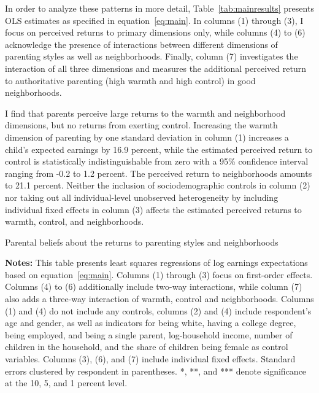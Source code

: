 \documentclass[12pt, a4paper, english]{article}
\begin{document}
In order to analyze these patterns in more detail, Table~\ref{tab:mainresults} presents OLS estimates as specified in equation~\eqref{eq:main}. In columns (1) through (3), I focus on perceived returns to primary dimensions only, while columns (4) to (6) acknowledge the presence of interactions between different dimensions of parenting styles as well as neighborhoods. Finally, column (7) investigates the interaction of all three dimensions and measures the additional perceived return to authoritative parenting (high warmth and high control) in good neighborhoods.

I find that parents perceive large returns to the warmth and neighborhood dimensions, but no returns from exerting control. Increasing the warmth dimension of parenting by one standard deviation in column (1) increases a child's expected earnings by 16.9 percent, while the estimated perceived return to control is statistically indistinguishable from zero with a 95\% confidence interval ranging from -0.2 to 1.2 percent. The perceived return to neighborhoods amounts to 21.1 percent. Neither the inclusion of sociodemographic controls in column (2) nor taking out all individual-level unobserved heterogeneity by including individual fixed effects in column (3) affects the estimated perceived returns to warmth, control, and neighborhoods.

\begin{table}[h!]
    \caption{Parental beliefs about the returns to parenting styles and neighborhoods}\label{tab:mainresults}
    \resizebox{\textwidth}{!}{
        
    }
    \vspace{0.5em}
    \caption*{\footnotesize \textbf{Notes:} This table presents least squares regressions of log earnings expectations based on equation~\eqref{eq:main}. Columns (1) through (3) focus on first-order effects. Columns (4) to (6) additionally include two-way interactions, while column (7) also adds a three-way interaction of warmth, control and neighborhoods. Columns (1) and (4) do not include any controls, columns (2) and (4) include respondent's age and gender, as well as indicators for being white, having a college degree, being employed, and being a single parent, log-household income, number of children in the household, and the share of children being female as control variables. Columns (3), (6), and (7) include individual fixed effects. Standard errors clustered by respondent in parentheses. *, **, and *** denote significance at the 10, 5, and 1 percent level.}
\end{table}
\end{document}
